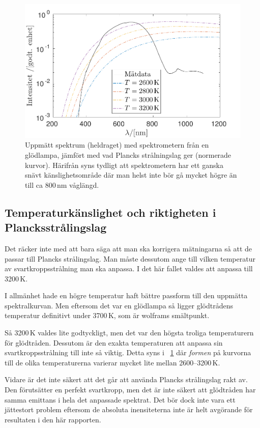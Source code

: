 \documentclass[11pt,a4paper]{article}
\newcommand{\figref}{\figurename~\ref}
\begin{document}
\begin{figure}\centering
\centerline{ %
\includegraphics[width=.9\textwidth]{svartkropp.pdf}
}
\caption{Uppmätt spektrum (heldraget) med spektrometern från en
  glödlampa, jämfört med vad Plancks strålningslag ger (normerade
  kurvor). Härifrån syns tydligt att spektrometern har ett ganska
  snävt känslighetsområde där man helst inte bör gå mycket högre än
  till ca 800\,nm våglängd.}
\label{fig:svartkropp}
\end{figure}


\subsection{Temperaturkänslighet 
               och riktigheten i Plancksstrålingslag} 
Det räcker inte med att bara säga att man ska korrigera mätningarna
så att de passar till Plancks strålingslag. Man måste dessutom ange
till vilken temperatur av svartkroppsstrålning man ska anpassa. I det
här fallet valdes att anpassa till 3200\,K. 

I allmänhet hade en högre temperatur haft bättre passform till den
uppmätta spektralkurvan. Men eftersom det var en glödlampa så ligger
glödtrådens temperatur definitivt under 3700\,K, som är wolframs
smältpunkt. 

Så 3200\,K valdes lite godtyckligt, men det var den högsta troliga
temperaturern för glödtråden. Dessutom är den exakta temperaturen att
anpassa sin svartkroppsstrålning till inte så viktig. Detta syns i
\figref{fig:svartkropp} där \emph{formen} på kurvorna till de olika
temperaturerna varierar mycket lite mellan 2600--3200\,K. 

Vidare är det inte säkert att det går att använda Plancks strålingslag
rakt av. Den förutsätter en perfekt svartkropp, men det är inte säkert
att glödtråden har samma emittans i hela det anpassade spektrat. Det
bör dock inte vara ett jättestort problem eftersom de absoluta
inensiteterna inte är helt avgörande för resultaten i den här
rapporten. 
\end{document}
